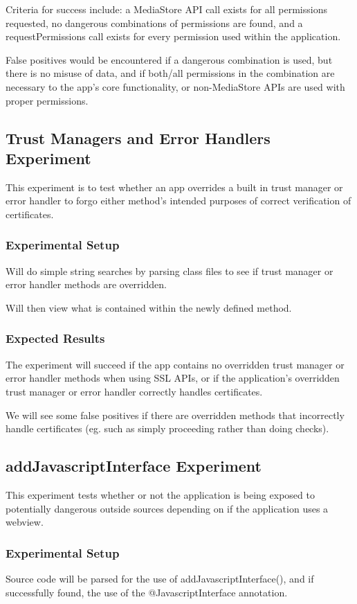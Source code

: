 \documentclass[10pt,twocolumn,pdftex]{article}
\begin{document}
    Criteria for success include:
    a MediaStore API call exists for all permissions requested, 
    no dangerous combinations of permissions are found, and
    a requestPermissions call exists for every permission used within the application.

    False positives would be encountered if
    a dangerous combination is used, but there is no misuse of data, and if both/all permissions in the combination are necessary to the app’s core functionality, or 
    non-MediaStore APIs are used with proper permissions.


\subsection{Trust Managers and Error Handlers Experiment}
    This experiment is to test whether an app overrides a built in trust manager or error handler to forgo either method's intended purposes of correct verification of certificates. 

    \subsubsection{Experimental Setup}
    Will do simple string searches by parsing class files to see if trust manager or error handler methods are overridden.
    
    Will then view what is contained within the newly defined method. 

    \subsubsection{Expected Results}
    The experiment will succeed if the app contains no overridden trust manager or error handler methods when using SSL APIs, or if the application's overridden trust manager or error handler correctly handles certificates.

    We will see some false positives if there are overridden methods that incorrectly handle certificates (eg. such as simply proceeding rather than doing checks).


\subsection{addJavascriptInterface Experiment}
This experiment tests whether or not the application is being exposed to potentially dangerous outside sources depending on if the application uses a webview.

    \subsubsection{Experimental Setup}
    Source code will be parsed for the use of addJavascriptInterface(), and if successfully found, the use of the @JavascriptInterface annotation.
\end{document}
